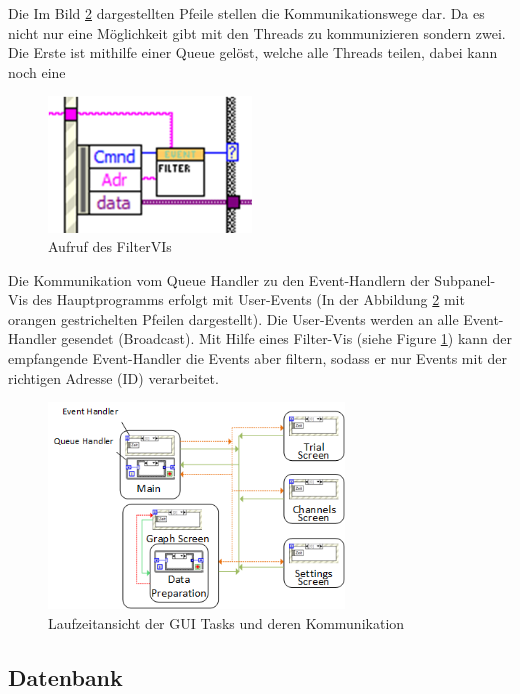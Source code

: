 \documentclass[10pt]{scrartcl}
\begin{document}
Die Im Bild \ref{fig:LaufzeitansichtUDA} dargestellten Pfeile stellen die Kommunikationswege dar. Da es nicht nur eine Möglichkeit gibt mit den Threads zu kommunizieren sondern zwei. Die Erste ist mithilfe einer Queue gelöst, welche alle Threads teilen, dabei kann noch eine
\begin{figure}
	\begin{center}
		\includegraphics[width=0.48\textwidth]{filterVI.png}
		\caption{Aufruf des FilterVIs}
		\label{fig:filterVI}
	\end{center}
\end{figure}
Die Kommunikation vom Queue Handler zu den Event-Handlern der Subpanel-Vis des Hauptprogramms erfolgt mit User-Events (In der Abbildung \ref{fig:LaufzeitansichtUDA} mit orangen gestrichelten Pfeilen dargestellt). Die User-Events werden an alle Event-Handler gesendet (Broadcast). Mit Hilfe eines Filter-Vis (siehe Figure \ref{fig:filterVI}) kann der empfangende Event-Handler die Events aber filtern, sodass er nur Events mit der richtigen Adresse (ID) verarbeitet.

\begin{figure}[htbp] 
	\centering
	\includegraphics[width=0.7\textwidth]{Laufzeitansicht}
	\caption{Laufzeitansicht der GUI Tasks und deren Kommunikation}
	\label{fig:LaufzeitansichtUDA}
\end{figure}

\subsection{Datenbank}
\end{document}
